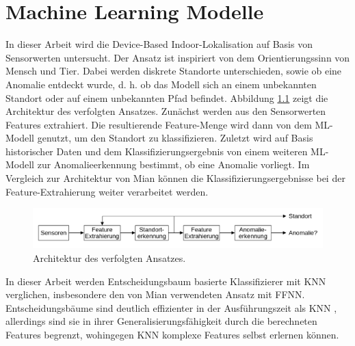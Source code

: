 \chapter{Machine Learning Modelle}
In dieser Arbeit wird die Device-Based Indoor-Lokalisation auf Basis von Sensorwerten untersucht.
Der Ansatz ist inspiriert von dem Orientierungssinn von Mensch und Tier.
Dabei werden diskrete Standorte unterschieden, sowie ob eine Anomalie entdeckt wurde,
d. h. ob das Modell sich an einem unbekannten Standort oder auf einem unbekannten Pfad befindet.
\newline
\newline
Abbildung \ref{fig:model_idea} zeigt die Architektur des verfolgten Ansatzes.
Zunächst werden aus den Sensorwerten Features extrahiert.
Die resultierende Feature-Menge wird dann von dem ML-Modell genutzt, um den Standort zu klassifizieren.
Zuletzt wird auf Basis historischer Daten und dem Klassifizierungsergebnis von einem weiteren ML-Modell zur Anomalieerkennung bestimmt, ob eine Anomalie vorliegt.
Im Vergleich zur Architektur von Mian \cite{naveedThesis} können die Klassifizierungsergebnisse bei der Feature-Extrahierung weiter verarbeitet werden.
\begin{figure}[h!]
    \centering
    \includegraphics[width=\linewidth]{images/model_idea.png}
    \caption{Architektur des verfolgten Ansatzes.}
    \label{fig:model_idea}
\end{figure}
\newline
In dieser Arbeit werden Entscheidungsbaum basierte Klassifizierer mit KNN verglichen, insbesondere den von Mian verwendeten Ansatz mit FFNN.
Entscheidungsbäume sind deutlich effizienter in der Ausführungszeit als KNN \cite{dymelThesis},
allerdings sind sie in ihrer Generalisierungsfähigkeit durch die berechneten Features begrenzt,
wohingegen KNN komplexe Features selbst erlernen können.








